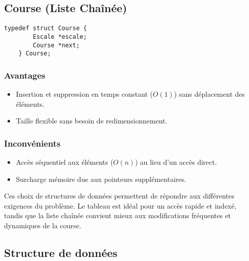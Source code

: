 \subsection{Course (Liste Chaînée)}
\begin{lstlisting}[caption={Structure de Course (liste chainée)}]
    typedef struct Course {
        Escale *escale;
        Course *next;
    } Course;
\end{lstlisting}

\subsubsection{Avantages}
\begin{itemize}
    \item Insertion et suppression en temps constant ($O(1)$) sans déplacement des éléments.
    \item Taille flexible sans besoin de redimensionnement.
\end{itemize}

\subsubsection{Inconvénients}
\begin{itemize}
    \item Accès séquentiel aux éléments ($O(n)$) au lieu d'un accès direct.
    \item Surcharge mémoire due aux pointeurs supplémentaires.
\end{itemize}

Ces choix de structures de données permettent de répondre aux différentes exigences du problème.
Le tableau est idéal pour un accès rapide et indexé,
tandis que la liste chaînée convient mieux aux modifications
fréquentes et dynamiques de la course.

\subsection{Structure de données}

